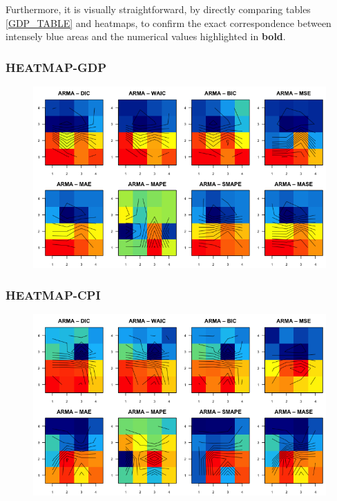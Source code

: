 \documentclass{Configuration_Files/PoliMi3i_thesis}
\begin{document}
Furthermore, it is visually straightforward, by directly comparing tables \ref{GDP_TABLE} and heatmaps, to confirm the exact correspondence between intensely blue areas and the numerical values highlighted in \textbf{bold}.
\newpage
\subsubsection{HEATMAP-GDP}
\begin{figure}[H]
    \centering
    \includegraphics[width=0.75\linewidth]{HEATMAP-CORRETTO.png}
\end{figure}
\subsubsection{HEATMAP-CPI}
\begin{figure}[H]
    \centering
    \includegraphics[width=0.75\linewidth]{HEATMAP_CPI.png}
\end{figure}






\newpage
\end{document}
